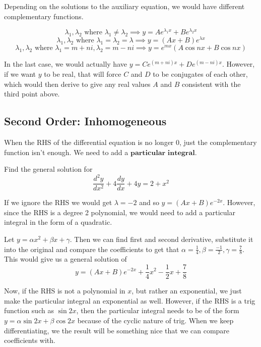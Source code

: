 \documentclass{article}
\newcommand{\f}[2]{\frac{#1}{#2}}
\theoremstyle{mytheoremstyle}
\theoremstyle{mytheoremstyle}
\theoremstyle{myproblemstyle}
\theoremstyle{myproblemstyle}
\begin{document}
    Depending on the solutions to the auxiliary equation, we would have different complementary functions.

    \begin{theorem}
        \[\lambda_1, \lambda_2 \text{ where } \lambda_1 \neq \lambda_2 \implies y = Ae^{\lambda_1 x} + Be^{\lambda_2 x}\]
        \[\lambda_1, \lambda_2 \text{ where } \lambda_1 = \lambda_2 = \lambda \implies y = (Ax + B)e^{\lambda x}\]
        \[\lambda_1, \lambda_2 \text{ where } \lambda_1 = m + ni, \lambda_2 = m-ni \implies y = e^{mx}(A\cos{nx} + B\cos{nx})\]
    \end{theorem}

    In the last case, we would actually have $y = Ce^{(m + ni)x} + De^{(m-ni)x}$. However, if we want $y$ to be real, that will force $C$ and $D$ to be conjugates of each other, which would then derive to give any real values $A$ and $B$ consistent with the third point above.

    \subsection{Second Order: Inhomogeneous}
    When the RHS of the differential equation is no longer $0$, just the complementary function isn't enough. We need to add a $\textbf{particular integral}$.

    \begin{example}
        Find the general solution for \[\frac{d^2y}{dx^2} + 4\frac{dy}{dx} + 4y = 2 + x^2\]
    \end{example}

    If we ignore the RHS we would get $\lambda = -2$ and so $y = (Ax + B)e^{-2x}$. However, since the RHS is a degree 2 polynomial, we would need to add a particular integral in the form of a quadratic. 
    
    Let $y = \alpha x^2 + \beta x + \gamma$. Then we can find first and second derivative, substitute it into the original and compare the coefficients to get that $\alpha = \f{1}{4}, \beta = \frac{-1}{2}, \gamma = \f{7}{8}$. This would give us a general solution of \[y = (Ax + B)e^{-2x} + \frac{1}{4}x^2 - \f{1}{2}x + \f{7}{8}\]


    Now, if the RHS is not a polynomial in $x$, but rather an exponential, we just make the particular integral an exponential as well. However, if the RHS is a trig function such as $\sin{2x}$, then the particular integral needs to be of the form $y = \alpha \sin{2x} + \beta \cos{2x}$ because of the cyclic nature of trig. When we keep differentiating, we the result will be something nice that we can compare coefficients with.
\end{document}
